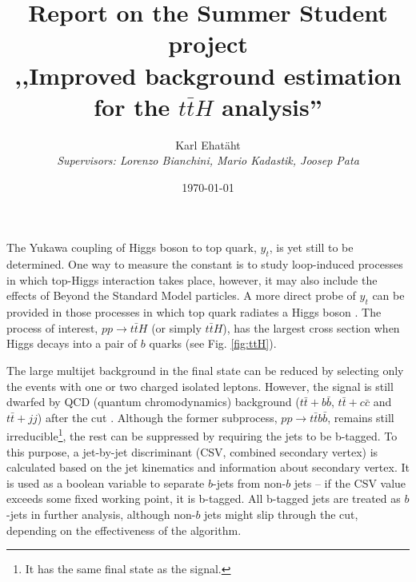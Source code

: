 \documentclass[12pt,a4paper]{article}
\title{\TitleFont\textbf{Report on the Summer Student project\\,,Improved background estimation for the $t\bar{t}H$ analysis''}}
\author{Karl Ehatäht\\[0.5em]
\textit{Supervisors: Lorenzo Bianchini, Mario Kadastik, Joosep Pata}}
\date\today
\begin{document}
\maketitle

The Yukawa coupling of Higgs boson to top quark, $y_t$, is yet still to be determined.
One way to measure the constant is to study loop-induced processes in which top-Higgs interaction takes place, however, it may also include the effects of Beyond the Standard Model particles.
A more direct probe of $y_t$ can be provided in those processes in which top quark radiates a Higgs boson \cite{CMSpaper}.
The process of interest, $pp\to t\bar{t}H$ (or simply $t\bar{t}H$), has the largest cross section when Higgs decays into a pair of $b$ quarks \cite{dittmaier2011handbook} (see Fig. \ref{fig:ttH}).

The large multijet background in the final state  can be reduced by selecting only the events with one or two charged isolated leptons.
However, the signal is still dwarfed by QCD (quantum chromodynamics) background ($t\bar{t}+b\bar{b}$, $t\bar{t}+c\bar{c}$ and $t\bar{t}+jj$) after the cut \cite{ATLASconference}.
Although the former subprocess, $pp\to t\bar{t}b\bar{b}$, remains still irreducible\footnote{It has the same final state as the signal.}, the rest can be suppressed by requiring the jets to be b-tagged.
To this purpose, a jet-by-jet discriminant (CSV, combined secondary vertex) is calculated based on the jet kinematics and information about secondary vertex.
It is used as a boolean variable to separate $b$-jets from non-$b$ jets -- if the CSV value exceeds some fixed working point, it is b-tagged.
All b-tagged jets are treated as $b$-jets in further analysis, although non-$b$ jets might slip through the cut, depending on the effectiveness of the algorithm.
\end{document}
